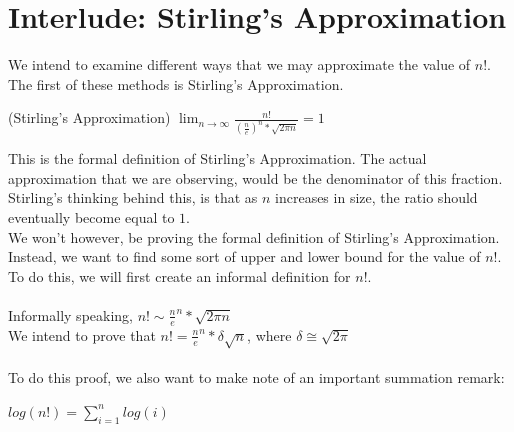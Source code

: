 \section{Interlude: Stirling's Approximation}
We intend to examine different ways that we may approximate the value of $n!$. The first of these methods is Stirling's Approximation.\\
\begin{theorem}
    (Stirling's Approximation) $\lim_{n\to\infty} \frac{n!}{(\frac{n}{e})^n * \sqrt{2\pi n}} = 1$
\end{theorem}
This is the formal definition of Stirling's Approximation. The actual approximation that we are observing, would be the denominator of this fraction. Stirling's thinking behind this, is that as $n$ increases in size, the ratio should eventually become equal to $1$.\\
We won't however, be proving the formal definition of Stirling's Approximation. Instead, we want to find some sort of upper and lower bound for the value of $n!$. To do this, we will first create an informal definition for $n!$.\\
\\
Informally speaking, $n! \sim \frac n e ^n * \sqrt{2\pi n}$\\
We intend to prove that $n! = \frac n e ^n * \delta \sqrt{n}$, where $\delta \cong \sqrt{2\pi}$\\
\\
To do this proof, we also want to make note of an important summation remark:
\begin{remark}
    $log(n!) = \sum_{i=1}^{n} {log(i)}$\\
\end{remark}

